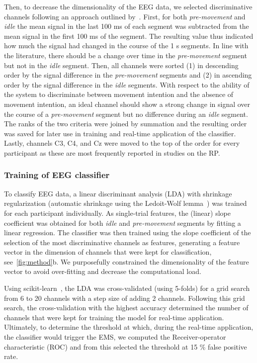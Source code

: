 Then, to decrease the dimensionality of the EEG data, we selected discriminative channels following an approach outlined by~\citep{Schultze-Kraft2021-cu}. First, for both \textit{pre-movement} and \textit{idle} the mean signal in the last 100 ms of each segment was subtracted from the mean signal in the first 100 ms of the segment. The resulting value thus indicated how much the signal had changed in the course of the 1 s segments. In line with the literature, there should be a change over time in the \textit{pre-movement} segment but not in the \textit{idle} segment. Then, all channels were sorted (1) in descending order by the signal difference in the \textit{pre-movement} segments and (2) in ascending order by the signal difference in the \textit{idle} segments. With respect to the ability of the system to discriminate between movement intention and the absence of movement intention, an ideal channel should show a strong change in signal over the course of a \textit{pre-movement} segment but no difference during an \textit{idle} segment. The ranks of the two criteria were joined by summation and the resulting order was saved for later use in training and real-time application of the classifier. Lastly, channels C3, C4, and Cz were moved to the top of the order for every participant as these are most frequently reported in studies on the RP.

\subsubsection{Training of EEG classifier}
To classify EEG data, a linear discriminant analysis (LDA) with shrinkage regularization (automatic shrinkage using the Ledoit-Wolf lemma~\cite{Ledoit2004-bi}) was trained for each participant individually. As single-trial features, the (linear) slope coefficient was obtained for both \textit{idle} and \textit{pre-movement} segments by fitting a linear regression. The classifier was then trained using the slope coefficient of the selection of the most discriminative channels as features, generating a feature vector in the dimension of channels that were kept for classification, see~\ref{fig:method}b. We purposefully constrained the dimensionality of the feature vector to avoid over-fitting and decrease the computational load.

Using scikit-learn~\cite{Pedregosa2012-sj}, the LDA was cross-validated (using 5-folds) for a grid search from 6 to 20 channels with a step size of adding 2 channels. Following this grid search, the cross-validation with the highest accuracy determined the number of channels that were kept for training the model for real-time application. Ultimately, to determine the threshold at which, during the real-time application, the classifier would trigger the EMS, we computed the Receiver-operator characteristic (ROC) and from this selected the threshold at 15 \% false positive rate.

